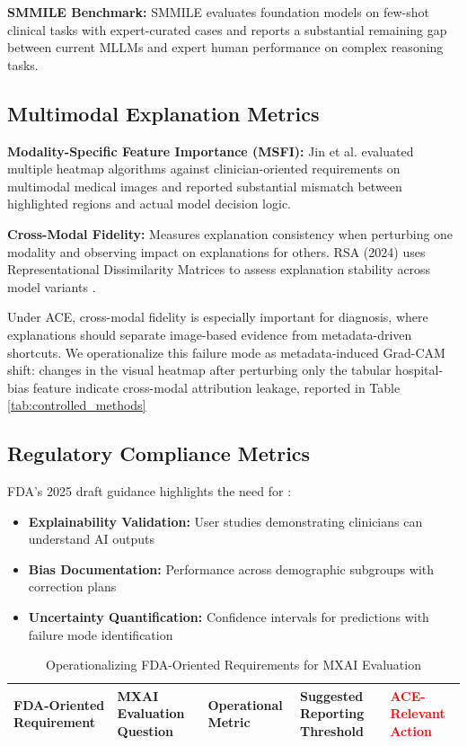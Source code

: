 \documentclass[pdflatex,sn-mathphys-num]{sn-jnl}%
\theoremstyle{thmstyleone}%
\theoremstyle{thmstyletwo}%
\theoremstyle{thmstylethree}%
\begin{document}
\begin{itemize}
\textbf{SMMILE Benchmark:} SMMILE \cite{rieff2025smmileexpertdrivenbenchmarkmultimodal} evaluates foundation models on few-shot clinical tasks with expert-curated cases and reports a substantial remaining gap between current MLLMs and expert human performance on complex reasoning tasks.

\subsection{Multimodal Explanation Metrics}

\textbf{Modality-Specific Feature Importance (MSFI):} Jin et al. \cite{Jin_2022} evaluated multiple heatmap algorithms against clinician-oriented requirements on multimodal medical images and reported substantial mismatch between highlighted regions and actual model decision logic.

\textbf{Cross-Modal Fidelity:} Measures explanation consistency when perturbing one modality and observing impact on explanations for others. RSA (2024) uses Representational Dissimilarity Matrices to assess explanation stability across model variants \cite{Sharma2025viz}.

Under ACE, cross-modal fidelity is especially important for diagnosis, where explanations should separate image-based evidence from metadata-driven shortcuts. We operationalize this failure mode as metadata-induced Grad-CAM shift: changes in the visual heatmap after perturbing only the tabular hospital-bias feature indicate cross-modal attribution leakage, reported in Table \ref{tab:controlled_methods}

\subsection{Regulatory Compliance Metrics}

FDA's 2025 draft guidance highlights the need for \cite{fda2025draft}:
\begin{itemize}
    \item \textbf{Explainability Validation:} User studies demonstrating clinicians can understand AI outputs
    \item \textbf{Bias Documentation:} Performance across demographic subgroups with correction plans
    \item \textbf{Uncertainty Quantification:} Confidence intervals for predictions with failure mode identification
\end{itemize}

\begin{table}[h!]
\centering
\caption{Operationalizing FDA-Oriented Requirements for MXAI Evaluation}
\label{tab:fda_operational_metrics}
{\scriptsize
\setlength{\tabcolsep}{3pt}
\renewcommand{\arraystretch}{1.2}
\begin{tabularx}{\textwidth}{|L{2.0cm}|L{2.5cm}|L{3.0cm}|L{3.0cm}|X|}
\hline
\textbf{FDA-Oriented Requirement} &
\textbf{MXAI Evaluation Question} &
\textbf{Operational Metric} &
\textbf{Suggested Reporting Threshold} &
\textbf{\textcolor{red}{ACE-Relevant Action}} \\ \hline


\end{tabularx}}
\end{table}
\end{itemize}
\end{document}
